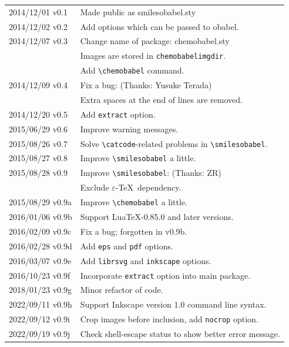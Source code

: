 \documentclass[12pt]{ltjsarticle}
\begin{document}
\begin{table}[h]
\centering
\begin{tabular}{ll}
2014/12/01 v0.1  & Made public as \textsf{smilesobabel.sty} \\
2014/12/02 v0.2  & Add options which can be passed to obabel. \\
2014/12/07 v0.3  & Change name of package: \textsf{chemobabel.sty} \\
                 & Images are stored in \texttt{chemobabelimgdir}. \\
                 & Add \verb|\chemobabel| command. \\
2014/12/09 v0.4  & Fix a bug: (Thanks: Yusuke Terada) \\
                 & Extra spaces at the end of lines are removed. \\
2014/12/20 v0.5  & Add \verb|extract| option. \\
2015/06/29 v0.6  & Improve warning messages. \\
2015/08/26 v0.7  & Solve \verb|\catcode|-related problems in \verb|\smilesobabel|. \\
2015/08/27 v0.8  & Improve \verb|\smilesobabel| a little. \\
2015/08/28 v0.9  & Improve \verb|\smilesobabel|: (Thanks: ZR) \\
                 & Exclude $\varepsilon$-\TeX\ dependency. \\
2015/08/29 v0.9a & Improve \verb|\chemobabel| a little. \\
2016/01/06 v0.9b & Support Lua\TeX-0.85.0 and later versions. \\
2016/02/09 v0.9c & Fix a bug; forgotten in v0.9b. \\
2016/02/28 v0.9d & Add \verb|eps| and \verb|pdf| options. \\
2016/03/07 v0.9e & Add \verb|librsvg| and \verb|inkscape| options. \\
2016/10/23 v0.9f & Incorporate \verb|extract| option into main package. \\
2018/01/23 v0.9g & Minor refactor of code. \\
2022/09/11 v0.9h & Support Inkscape version 1.0 command line syntax. \\
2022/09/12 v0.9i & Crop images before inclusion, add \verb|nocrop| option. \\
2022/09/19 v0.9j & Check shell-escape status to show better error message. \\
\end{tabular}
\end{table}
\end{document}
